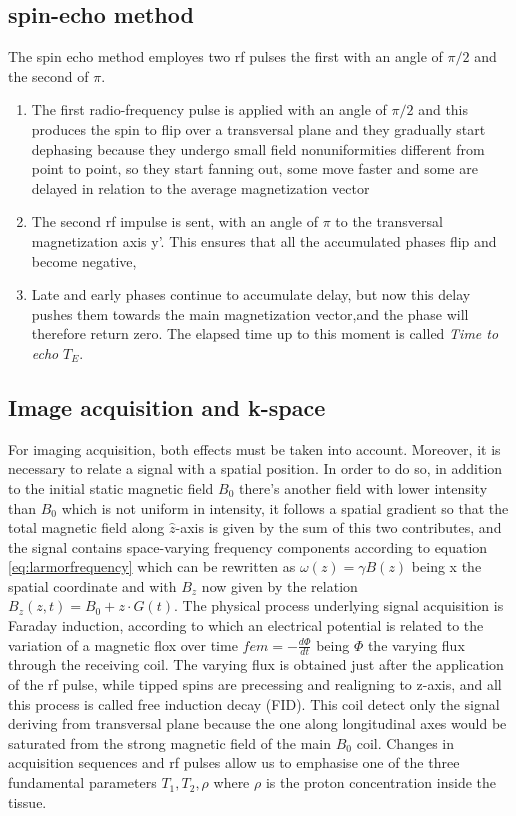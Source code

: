 \documentclass[a4paper,11pt]{article}
\begin{document}
\subsection{spin-echo method}
The spin echo method employes two rf pulses the first with an angle of $\pi/2$ and the second of $\pi$.
\begin{enumerate}
\item The first radio-frequency pulse is applied with an angle of $\pi/2$ and this produces the spin to flip over a transversal plane and they gradually start dephasing because they undergo small field nonuniformities different from point to point, so they start fanning out, some move faster and some are delayed in relation to the average magnetization vector
\item The second rf impulse is sent, with an angle of $\pi$ to the transversal magnetization axis y'. This ensures that all the accumulated phases flip and become negative,
\item Late and early phases continue to accumulate delay, but now this delay pushes them towards the main magnetization vector,and the phase will therefore return zero. The elapsed time up to this moment is called \emph{Time to echo} $T_E$.
\end{enumerate}
\subsection{Image acquisition and k-space}
For imaging acquisition, both effects must be taken into account. Moreover, it is necessary to relate a signal with a spatial position.
In order to do so, in addition to the initial static magnetic field $B_0$ there's another field with lower intensity than $B_0$ which is not uniform in intensity, it follows a spatial gradient so that the total magnetic field along $\hat z$-axis is given by the sum of this two contributes, and the signal contains space-varying frequency components according to equation \ref{eq:larmorfrequency} which can be rewritten as $\omega(z) = \gamma B(z)$ being x the spatial coordinate and with $B_z$ now given by the relation $B_z(z, t) = B_0 + z\cdot G(t)$.
The physical process underlying signal acquisition is Faraday induction, according to which an electrical potential is related to the variation of a magnetic flox over time $fem = -\frac{d\Phi}{dt}$ being $\Phi$ the varying flux through the receiving coil.
The varying flux is obtained just after the application of the rf pulse, while tipped spins are precessing and realigning to z-axis, and all this process is called free induction decay (FID). This coil detect only the signal deriving from transversal plane because the one along longitudinal axes would be saturated from the strong magnetic field of the main $B_0$ coil. Changes in acquisition sequences and rf pulses allow us to emphasise one of the three fundamental parameters $T_1, T_2, \rho$ where $\rho$ is the proton concentration inside the tissue.
\end{document}
